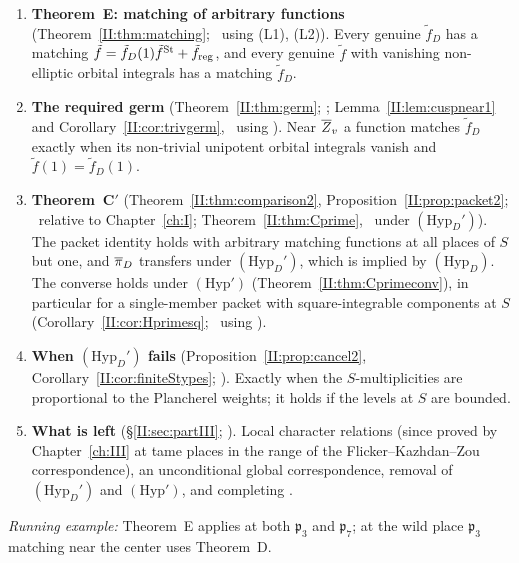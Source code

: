 \begin{enumerate}[leftmargin=*,label=\arabic*.]
\item \textbf{Theorem~E: matching of arbitrary functions} (Theorem~\ref{II:thm:matching}; \Pv\ using (L1), (L2)). Every genuine $\tilde f_D$ has a matching $\tilde f=\tilde f_D(1)\tilde f^{\mathrm{St}}+\tilde f_{\mathrm{reg}}$, and every genuine $\tilde f$ with vanishing non-elliptic orbital integrals has a matching $\tilde f_D$.
\item \textbf{The required germ} (Theorem~\ref{II:thm:germ}; \Pv; Lemma~\ref{II:lem:cuspnear1} and Corollary~\ref{II:cor:trivgerm}, \Pv\ using \Ev). Near $\overline{Z}_v$ a function matches $\tilde f_D$ exactly when its non-trivial unipotent orbital integrals vanish and $\tilde f(1)=\tilde f_D(1)$.
\item \textbf{Theorem~C$'$} (Theorem~\ref{II:thm:comparison2}, Proposition~\ref{II:prop:packet2}; \Pv\ relative to Chapter~\ref{ch:I}; Theorem~\ref{II:thm:Cprime}, \Pv\ under $(\mathrm{Hyp}_D')$). The packet identity holds with arbitrary matching functions at all places of $S$ but one, and $\overline{\pi}_D$ transfers under $(\mathrm{Hyp}_D')$, which is implied by $(\mathrm{Hyp}_D)$. The converse holds under $(\mathrm{Hyp}')$ (Theorem~\ref{II:thm:Cprimeconv}), in particular for a single-member packet with square-integrable components at $S$ (Corollary~\ref{II:cor:Hprimesq}; \Pv\ using \Ev).
\item \textbf{When $(\mathrm{Hyp}_D')$ fails} (Proposition~\ref{II:prop:cancel2}, Corollary~\ref{II:cor:finiteStypes}; \Pv). Exactly when the $S$-multiplicities are proportional to the Plancherel weights; it holds if the levels at $S$ are bounded.
\item \textbf{What is left} (\S\ref{II:sec:partIII}; \Cv). Local character relations (since proved by Chapter~\ref{ch:III} at tame places in the range of the Flicker--Kazhdan--Zou correspondence), an unconditional global correspondence, removal of $(\mathrm{Hyp}_D')$ and $(\mathrm{Hyp}')$, and completing \cite[Remark~10.3]{JC26a}.
\end{enumerate}
\emph{Running example:} Theorem~E applies at both $\mathfrak p_3$ and $\mathfrak p_7$; at the wild place $\mathfrak p_3$ matching near the center uses Theorem~D.
\endgroup
\begingroup
\providecommand{\A}{}\renewcommand{\A}{\mathbb A}
\providecommand{\C}{}\renewcommand{\C}{\mathbb C}
\providecommand{\Z}{}\renewcommand{\Z}{\mathbb Z}
\providecommand{\GL}{}\renewcommand{\GL}{\operatorname{GL}}
\providecommand{\Nrd}{}\renewcommand{\Nrd}{\operatorname{Nrd}}
\providecommand{\Irr}{}\renewcommand{\Irr}{\operatorname{Irr}}
\providecommand{\vol}{}\renewcommand{\vol}{\operatorname{vol}}
